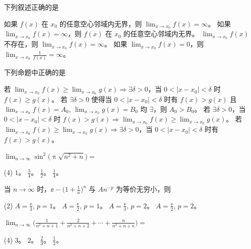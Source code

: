 \begin{ti}
	下列叙述正确的是
	\begin{tasks}
		\task 如果 $f(x)$ 在 $x_0$ 的任意空心邻域内无界，则 $\lim_{x \to x_0} f(x) = \infty$。
		\task 如果 $\lim_{x \to x_0} f(x) = \infty$，则 $f(x)$ 在 $x_0$ 的任意空心邻域内无界。
		\task $\lim_{x \to x_0} f(x)$ 不存在，则 $\lim_{x \to x_0} f(x) = \infty$。
		\task 如果 $\lim_{x \to x_0} f(x) = 0$，则 $\lim_{x \to x_0} \frac{1}{f(x)} = \infty$。
	\end{tasks}
\end{ti}

\begin{ti}
	下列命题中正确的是
	\begin{tasks}
		\task 若 $\lim_{x \to x_0} f(x) \geq \lim_{x \to x_0} g(x) \Rightarrow \exists \delta > 0$，当 $0 < |x-x_0| < \delta$ 时 $f(x) \geq g(x)$。\xeCJKnobreak
		\task 若 $\exists \delta > 0$ 使得当 $0 < |x-x_0| < \delta$ 时有 $f(x) > g(x)$ 且 $\lim_{x \to x_0} f(x) = A_0$, $\lim_{x \to x_0} g(x) = B_0$ 均 $\exists$，则 $A_0 > B_0$。
		\task 若 $\exists \delta > 0$，当 $0 < |x-x_0| < \delta$ 时 $f(x) > g(x) \Rightarrow \lim_{x \to x_0} f(x) \geq \lim_{x \to x_0} g(x)$。\xeCJKnobreak
		\task 若 $\lim_{x \to x_0} f(x) \geq \lim_{x \to x_0} g(x) \Rightarrow \exists \delta > 0$，当 $0 < |x-x_0| < \delta$ 时有 $f(x) > g(x)$。
	\end{tasks}
\end{ti}

\begin{ti}
	$\lim_{n \to \infty} \sin^2\bigl( \uppi \sqrt{n^2+n} \bigr) = $
	\begin{tasks}(4)
		\task $1$。
		\task $\frac{3}{4}$。
		\task $\frac{1}{2}$。
		\task $\frac{1}{4}$。
	\end{tasks}
\end{ti}

\begin{ti}
	当 $n \to \infty$ 时，$\ee - \biggl(1 + \frac{1}{n}\biggr)^n$ 与 $An^{-p}$ 为等价无穷小，则
	\begin{tasks}(2)
		\task $A = \frac{\ee}{3}$, $p = 1$。
		\task $A = \frac{\ee}{2}$, $p = 1$。
		\task $A = \frac{\ee}{3}$, $p = 2$。
		\task $A = \frac{\ee}{2}$, $p = 2$。
	\end{tasks}
\end{ti}

\begin{ti}
	$\lim_{n \to \infty} \biggl( \frac{1}{n^2+n+1} + \frac{2}{n^2+n+2} + \cdots + \frac{n}{n^2+n+n} \biggr) = $
	\begin{tasks}(4)
		\task $3$。
		\task $2$。
		\task $\frac{2}{3}$。
		\task $\frac{1}{2}$。
	\end{tasks}
\end{ti}

